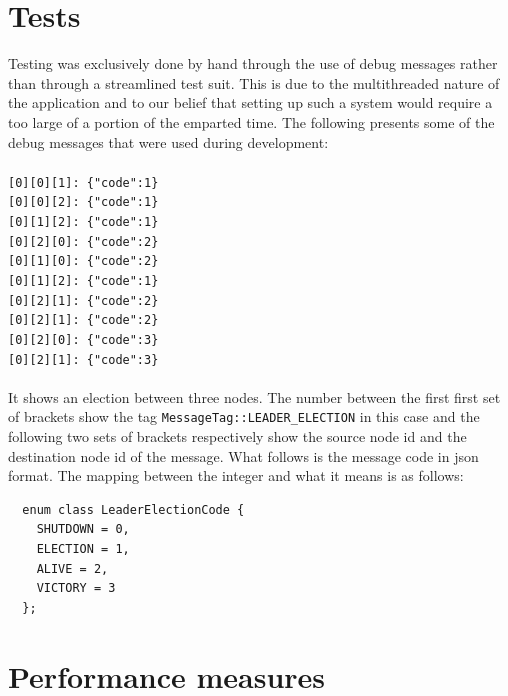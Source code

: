 \documentclass[11pt]{article}
\begin{document}
\section{Tests}
Testing was exclusively done by hand through the use of debug messages rather
than through a streamlined test suit. This is due to the multithreaded nature of
the application and to our belief that setting up such a system would require a
too large of a portion of the emparted time. The following presents some of the
debug messages that were used during development:\\\\
\texttt{[0][0][1]: \{"code":1\}}\\
\texttt{[0][0][2]: \{"code":1\}}\\
\texttt{[0][1][2]: \{"code":1\}}\\
\texttt{[0][2][0]: \{"code":2\}}\\
\texttt{[0][1][0]: \{"code":2\}}\\
\texttt{[0][1][2]: \{"code":1\}}\\
\texttt{[0][2][1]: \{"code":2\}}\\
\texttt{[0][2][1]: \{"code":2\}}\\
\texttt{[0][2][0]: \{"code":3\}}\\
\texttt{[0][2][1]: \{"code":3\}}\\\\
It shows an election between three nodes. The number between the first first set
of brackets show the tag \texttt{MessageTag::LEADER\_ELECTION} in this case and
the following two sets of brackets respectively show the source node id and the
destination node id of the message. What follows is the message code in json
format. The mapping between the integer and what it means is as follows:
\begin{verbatim}
  enum class LeaderElectionCode {
    SHUTDOWN = 0,
    ELECTION = 1,
    ALIVE = 2,
    VICTORY = 3
  };
\end{verbatim}
\section{Performance measures}
\end{document}
